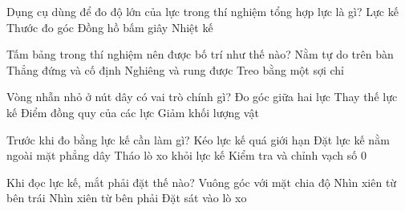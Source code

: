 

\begin{ex}
Dụng cụ dùng để đo độ lớn của lực trong thí nghiệm tổng hợp lực là gì?
\choice
{\True Lực kế}
{Thước đo góc}
{Đồng hồ bấm giây}
{Nhiệt kế}
\end{ex}

\begin{ex}
Tấm bảng trong thí nghiệm nên được bố trí như thế nào?
\choice
{Nằm tự do trên bàn}
{\True Thẳng đứng và cố định}
{Nghiêng và rung được}
{Treo bằng một sợi chỉ}
\end{ex}

\begin{ex}
Vòng nhẫn nhỏ ở nút dây có vai trò chính gì?
\choice
{Đo góc giữa hai lực}
{Thay thế lực kế}
{\True Điểm đồng quy của các lực}
{Giảm khối lượng vật}
\end{ex}

\begin{ex}
Trước khi đo bằng lực kế cần làm gì?
\choice
{Kéo lực kế quá giới hạn}
{Đặt lực kế nằm ngoài mặt phẳng dây}
{Tháo lò xo khỏi lực kế}
{\True Kiểm tra và chỉnh vạch số 0}
\end{ex}

\begin{ex}
Khi đọc lực kế, mắt phải đặt thế nào?
\choice
{\True Vuông góc với mặt chia độ}
{Nhìn xiên từ bên trái}
{Nhìn xiên từ bên phải}
{Đặt sát vào lò xo}
\end{ex}

